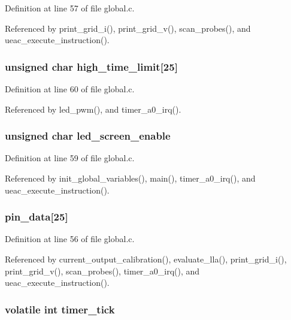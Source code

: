 Definition at line 57 of file global.c.

Referenced by print\_\-grid\_\-i(), print\_\-grid\_\-v(), scan\_\-probes(), and ueac\_\-execute\_\-instruction().
\subsubsection{\setlength{\rightskip}{0pt plus 5cm}unsigned char {\bf high\_\-time\_\-limit}[25]}\label{global_8h_a6}




Definition at line 60 of file global.c.

Referenced by led\_\-pwm(), and timer\_\-a0\_\-irq().
\subsubsection{\setlength{\rightskip}{0pt plus 5cm}unsigned char {\bf led\_\-screen\_\-enable}}\label{global_8h_a5}




Definition at line 59 of file global.c.

Referenced by init\_\-global\_\-variables(), main(), timer\_\-a0\_\-irq(), and ueac\_\-execute\_\-instruction().
\subsubsection{ {\bf pin\_\-data}[25]}\label{global_8h_a2}




Definition at line 56 of file global.c.

Referenced by current\_\-output\_\-calibration(), evaluate\_\-lla(), print\_\-grid\_\-i(), print\_\-grid\_\-v(), scan\_\-probes(), timer\_\-a0\_\-irq(), and ueac\_\-execute\_\-instruction().
\subsubsection{\setlength{\rightskip}{0pt plus 5cm}volatile int {\bf timer\_\-tick}}\label{global_8h_a4}




